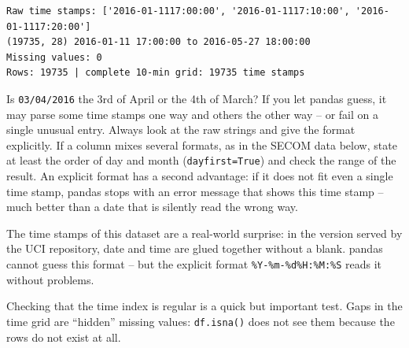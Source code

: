 \documentclass[
  letterpaper,
  DIV=11,
  numbers=noendperiod]{scrreprt}
\begin{document}
\begin{verbatim}
Raw time stamps: ['2016-01-1117:00:00', '2016-01-1117:10:00', '2016-01-1117:20:00']
(19735, 28) 2016-01-11 17:00:00 to 2016-05-27 18:00:00
Missing values: 0
Rows: 19735 | complete 10-min grid: 19735 time stamps
\end{verbatim}

\begin{tcolorbox}[enhanced jigsaw, left=2mm, title=\textcolor{quarto-callout-warning-color}{\faExclamationTriangle}\hspace{0.5em}{Pitfall: letting the software guess date formats}, opacityback=0, breakable, rightrule=.15mm, arc=.35mm, toptitle=1mm, colbacktitle=quarto-callout-warning-color!10!white, opacitybacktitle=0.6, coltitle=black, colframe=quarto-callout-warning-color-frame, bottomrule=.15mm, leftrule=.75mm, bottomtitle=1mm, titlerule=0mm, toprule=.15mm, colback=white]

Is \texttt{03/04/2016} the 3rd of April or the 4th of March? If you let
pandas guess, it may parse some time stamps one way and others the other
way -- or fail on a single unusual entry. Always look at the raw strings
and give the format explicitly. If a column mixes several formats, as in
the SECOM data below, state at least the order of day and month
(\texttt{dayfirst=True}) and check the range of the result. An explicit
format has a second advantage: if it does not fit even a single time
stamp, pandas stops with an error message that shows this time stamp --
much better than a date that is silently read the wrong way.

\end{tcolorbox}

The time stamps of this dataset are a real-world surprise: in the
version served by the UCI repository, date and time are glued together
without a blank. pandas cannot guess this format -- but the explicit
format \texttt{\%Y-\%m-\%d\%H:\%M:\%S} reads it without problems.

Checking that the time index is regular is a quick but important test.
Gaps in the time grid are ``hidden'' missing values: \texttt{df.isna()}
does not see them because the rows do not exist at all.
\end{document}
